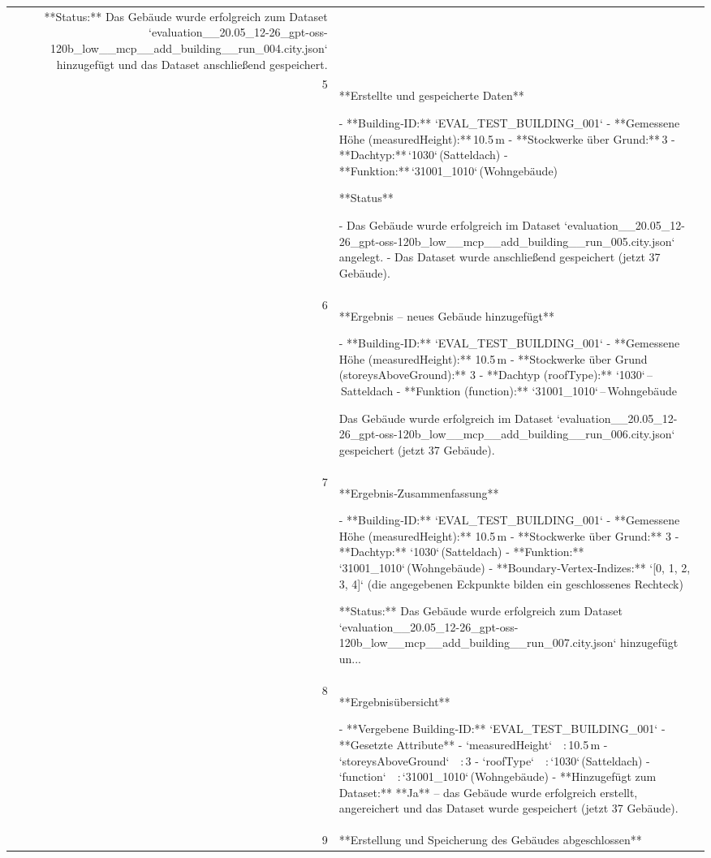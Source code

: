 \documentclass[a4paper,11pt]{article}
\begin{document}
\begin{table}[ht]
\begin{tabular}{r p{12cm}}
**Status:** Das Gebäude wurde erfolgreich zum Dataset `evaluation\_\_20.05\_12-26\_gpt-oss-120b\_low\_\_mcp\_\_add\_building\_\_run\_004.city.json` hinzugefügt und das Dataset anschließend gespeichert. \\
5 & **Erstellte und gespeicherte Daten**

- **Building‑ID:** `EVAL\_TEST\_BUILDING\_001`  
- **Gemessene Höhe (measuredHeight):** 10.5 m  
- **Stockwerke über Grund:** 3  
- **Dachtyp:** `1030` (Satteldach)  
- **Funktion:** `31001\_1010` (Wohngebäude)  

**Status**

- Das Gebäude wurde erfolgreich im Dataset `evaluation\_\_20.05\_12-26\_gpt-oss-120b\_low\_\_mcp\_\_add\_building\_\_run\_005.city.json` angelegt.  
- Das Dataset wurde anschließend gespeichert (jetzt 37 Gebäude). \\
6 & **Ergebnis – neues Gebäude hinzugefügt**

- **Building‑ID:** `EVAL\_TEST\_BUILDING\_001`  
- **Gemessene Höhe (measuredHeight):** 10.5 m  
- **Stockwerke über Grund (storeysAboveGround):** 3  
- **Dachtyp (roofType):** `1030` – Satteldach  
- **Funktion (function):** `31001\_1010` – Wohngebäude  

Das Gebäude wurde erfolgreich im Dataset `evaluation\_\_20.05\_12-26\_gpt-oss-120b\_low\_\_mcp\_\_add\_building\_\_run\_006.city.json` gespeichert (jetzt 37 Gebäude). \\
7 & **Ergebnis‑Zusammenfassung**

- **Building‑ID:** `EVAL\_TEST\_BUILDING\_001`  
- **Gemessene Höhe (measuredHeight):** 10.5 m  
- **Stockwerke über Grund:** 3  
- **Dachtyp:** `1030` (Satteldach)  
- **Funktion:** `31001\_1010` (Wohngebäude)  
- **Boundary‑Vertex‑Indizes:** `[0, 1, 2, 3, 4]` (die angegebenen Eckpunkte bilden ein geschlossenes Rechteck)

**Status:** Das Gebäude wurde erfolgreich zum Dataset `evaluation\_\_20.05\_12-26\_gpt-oss-120b\_low\_\_mcp\_\_add\_building\_\_run\_007.city.json` hinzugefügt un... \\
8 & **Ergebnisübersicht**

- **Vergebene Building‑ID:** `EVAL\_TEST\_BUILDING\_001`  
- **Gesetzte Attribute**  
  - `measuredHeight` : 10.5 m  
  - `storeysAboveGround` : 3  
  - `roofType` : `1030` (Satteldach)  
  - `function` : `31001\_1010` (Wohngebäude)  
- **Hinzugefügt zum Dataset:** **Ja** – das Gebäude wurde erfolgreich erstellt, angereichert und das Dataset wurde gespeichert (jetzt 37 Gebäude). \\
9 & **Erstellung und Speicherung des Gebäudes abgeschlossen**


\end{tabular}
\end{table}
\end{document}
